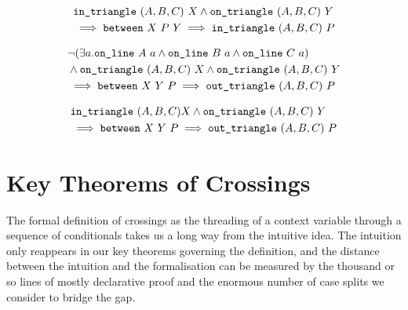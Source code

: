 \begin{equation}\label{eq:inTriangle2}
  \begin{split}
    &\texttt{in\_triangle}\ (A,B,C)\ X \wedge \texttt{on\_triangle}\ (A,B,C)\ Y\\
    &\implies \texttt{between}\ X\ P\ Y \implies \texttt{in\_triangle}\ (A,B,C)\ P
  \end{split}
\end{equation}

\begin{equation}\label{eq:outTriangle1}
  \begin{split}
    &\neg(\exists a.\texttt{on\_line}\ A\ a\wedge \texttt{on\_line}\ B\ a\wedge \texttt{on\_line}\ C\ a)\\
    &\wedge \texttt{on\_triangle}\ (A,B,C)\ X \wedge \texttt{on\_triangle}\ (A,B,C)\ Y\\
    &\implies \texttt{between}\ X\ Y\ P \implies \texttt{out\_triangle}\ (A,B,C)\ P
  \end{split}
\end{equation}

\begin{equation}\label{eq:outTriangle2}
  \begin{split}
    &\texttt{in\_triangle}\ (A,B,C) X \wedge \texttt{on\_triangle}\ (A,B,C)\ Y\\
    &\implies \texttt{between}\ X\ Y\ P \implies \texttt{out\_triangle}\ (A,B,C)\ P
  \end{split}
\end{equation}

\section{Key Theorems of Crossings}\label{sec:CrossingVerification}
The formal definition of crossings as the threading of a context variable through a sequence of conditionals takes us a long way from the intuitive idea. The intuition only reappears in our key theorems governing the definition, and the distance between the intuition and the formalisation can be measured by the thousand or so lines of mostly declarative proof and the enormous number of case splits we consider to bridge the gap.

